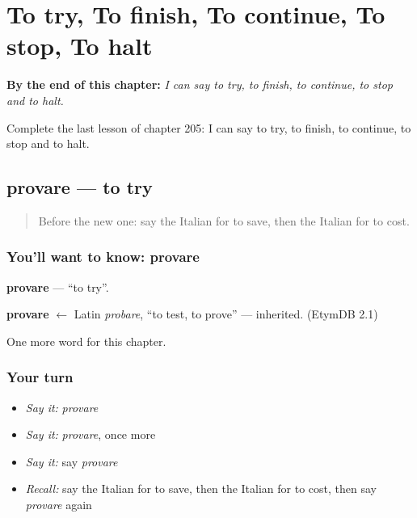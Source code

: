 
\chapter{To try, To finish, To continue, To stop, To halt}
\label{ch:it-to-try-to-finish-to-continue-to-stop-to-halt}

\begin{chapteropening}
\textbf{By the end of this chapter:} \emph{I can say to try, to finish, to continue, to stop and to halt.}

Complete the last lesson of chapter 205: I can say to try, to finish, to continue, to stop and to halt.
\end{chapteropening}

\section[provare]{provare — to try}

\label{lesson:IT-C205-provare}



\begin{quote}
Before the new one: say the Italian for to save, then the Italian for to cost.
\end{quote}

\subsection*{You'll want to know: provare}
\textbf{provare} — \textquotedblleft{}to try\textquotedblright{}.

\begin{cousinweb}
\textbf{provare} $\leftarrow$ Latin \emph{probare}, \textquotedblleft{}to test, to prove\textquotedblright{} — inherited. (EtymDB 2.1)
\end{cousinweb}

\begin{grammarlens}[title={What you've built}]
One more word for this chapter.
\end{grammarlens}

\subsection*{Your turn}
\begin{itemize}
\raggedright
  \item \emph{Say it:} \emph{provare}
  \item \emph{Say it:} \emph{provare}, once more
  \item \emph{Say it:} say \emph{provare}
  \item \emph{Recall:} say the Italian for to save, then the Italian for to cost, then say \emph{provare} again
\end{itemize}

